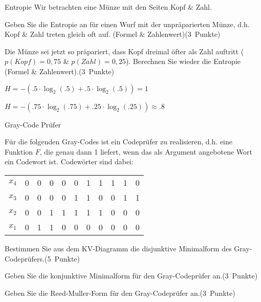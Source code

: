 \documentclass{exercisesheet}
\begin{document}
\begin{eexercises}{Entropie}{
    Wir betrachten eine Münze mit den Seiten Kopf \& Zahl.
  }
  \item Geben Sie die Entropie an für einen Wurf mit der unpräparierten Münze, d.h. Kopf \& Zahl treten gleich oft auf. (Formel \& Zahlenwert)\hfill(3~Punkte)
  \item Die Münze sei jetzt so präpariert, dass Kopf dreimal öfter als Zahl auftritt ($p(Kopf) = 0,75$ \& $p(Zahl) = 0,25$). Berechnen Sie wieder die Entropie (Formel \& Zahlenwert).(3~Punkte)
\end{eexercises}

\begin{solutions}
  \item $H = -(.5\cdot\log_2(.5) + .5\cdot\log_2(.5)) = 1$
  \item $H = -(.75\cdot\log_2(.75) + .25\cdot\log_2(.25)) \approx .8$
\end{solutions}

\begin{eexercises}{Gray-Code Prüfer}{
    Für die folgenden Gray-Codes ist ein Codeprüfer zu realisieren, d.h. eine Funktion $F$, die genau dann 1 liefert, wenn das als Argument angebotene Wort ein Codewort ist. Codewörter sind dabei:\par
    \begin{tabular}{c|cccc cccc cc}
      $x_4$ & 0 & 0 & 0 & 0 & 0 & 1 & 1 & 1 & 1 & 0 \\
      $x_3$ & 0 & 0 & 0 & 0 & 1 & 1 & 0 & 0 & 1 & 1 \\
      $x_2$ & 0 & 0 & 1 & 1 & 1 & 1 & 1 & 0 & 0 & 0 \\
      $x_1$ & 0 & 1 & 1 & 0 & 0 & 0 & 0 & 0 & 0 & 0 \\
    \end{tabular}
  }
  \item Bestimmen Sie aus dem KV-Diagramm die disjunktive Minimalform des Gray-Codeprüfers.\hfill(5~Punkte)
  \item Geben Sie die konjunktive Minimalform für den Gray-Codeprüfer an.\hfill(3~Punkte)
  \item Geben Sie die Reed-Muller-Form für den Gray-Codeprüfer an.\hfill(3~Punkte)\par
\end{eexercises}
\end{document}
